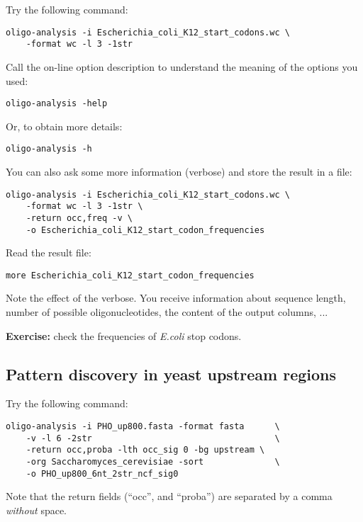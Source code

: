Try the following command:

\begin{verbatim}
oligo-analysis -i Escherichia_coli_K12_start_codons.wc \
    -format wc -l 3 -1str
\end{verbatim}

Call the on-line option description to understand the meaning of the options you used:
\begin{verbatim}
oligo-analysis -help
\end{verbatim}

Or, to obtain more details:
\begin{verbatim}
oligo-analysis -h
\end{verbatim}


You can also ask some more information (verbose) and store the result
in a file:

\begin{verbatim}
oligo-analysis -i Escherichia_coli_K12_start_codons.wc \
    -format wc -l 3 -1str \
    -return occ,freq -v \
    -o Escherichia_coli_K12_start_codon_frequencies
\end{verbatim}

Read the result file:

\begin{verbatim}
more Escherichia_coli_K12_start_codon_frequencies
\end{verbatim}

Note the effect of the verbose. You receive information about sequence
length, number of possible oligonucleotides, the content of the output
columns, ...

\textbf{Exercise:} check the frequencies of \textit{E.coli} stop codons.

\subsection{Pattern discovery in yeast upstream regions}

Try the following command:

\begin{verbatim} 
oligo-analysis -i PHO_up800.fasta -format fasta      \
    -v -l 6 -2str                                    \
    -return occ,proba -lth occ_sig 0 -bg upstream \
    -org Saccharomyces_cerevisiae -sort              \
    -o PHO_up800_6nt_2str_ncf_sig0 
\end{verbatim}

Note that the return fields (``occ'', and ``proba'') are separated by
a comma \textit{without} space.

